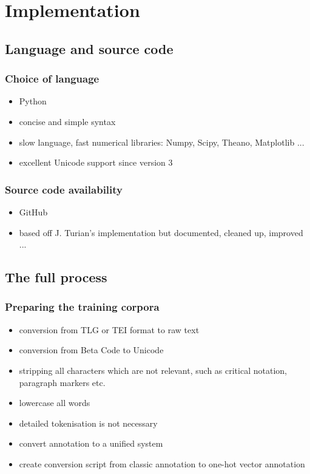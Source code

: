 
\chapter{Implementation}
\label{chp:implementation}

\section{Language and source code}
\label{sec:langsource}
\subsection{Choice of language}
\label{sec:language}

\begin{itemize}
\item Python
\item concise and simple syntax
\item slow language, fast numerical libraries: Numpy, Scipy, Theano, Matplotlib ...
\item excellent Unicode support since version 3
\end{itemize}

\subsection{Source code availability}
\label{sec:sourcecode}

\begin{itemize}
\item GitHub
\item based off J. Turian's implementation but documented, cleaned up, improved ...
\end{itemize}

\section{The full process}
\label{sec:process}

\subsection{Preparing the training corpora}
\label{sec:trainingcorpora}
\begin{itemize}
\item conversion from TLG or TEI format to raw text
\item conversion from Beta Code to Unicode
\item stripping all characters which are not relevant, such as
critical notation, paragraph markers etc.
\item lowercase all words
\item detailed tokenisation is not necessary
\item convert annotation to a unified system
\item create conversion script from classic annotation to one-hot vector annotation
\end{itemize}

